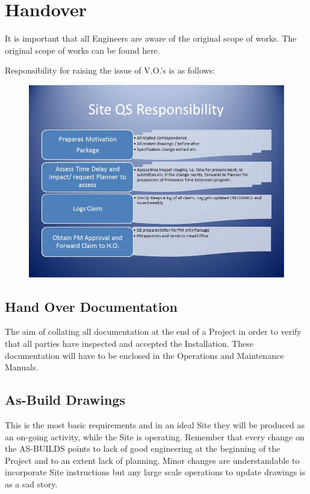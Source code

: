 \chapter{Handover}

It is important that all Engineers are aware of the original scope of works. The original scope of works can be found here.

Responsibility for raising the issue of V.O.'s is as follows:

\begin{figure}
\includegraphics[width=1.3\textwidth]{./graphics/Site-QS-responsibilities}
\end{figure}

\section*{Hand Over Documentation}

The aim of collating all documentation at the end of a Project in order to verify that all parties have inspected and accepted the Installation. These documentation will have to be enclosed in the Operations and Maintenance Manuals.

\section*{As-Build Drawings}

This is the most basic requirements and in an ideal Site they will be produced as an on-going activity, while the Site is operating. Remember that every change on the AS-BUILDS points to lack of good engineering at the beginning of the Project and to an extent lack of planning. Minor changes are understandable to incorporate Site instructions but any large scale operations to update drawings is as a sad story.

